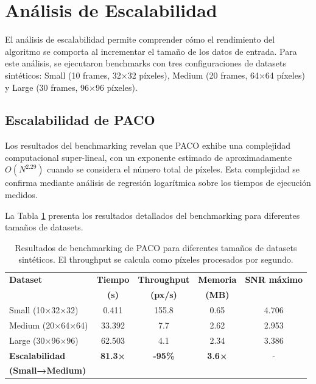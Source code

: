 \section{Análisis de Escalabilidad}

El análisis de escalabilidad permite comprender cómo el rendimiento del algoritmo se comporta al incrementar el tamaño de los datos de entrada. Para este análisis, se ejecutaron benchmarks con tres configuraciones de datasets sintéticos: Small (10 frames, 32×32 píxeles), Medium (20 frames, 64×64 píxeles) y Large (30 frames, 96×96 píxeles).

\subsection{Escalabilidad de PACO}

Los resultados del benchmarking revelan que PACO exhibe una complejidad computacional super-lineal, con un exponente estimado de aproximadamente $O(N^{2.29})$ cuando se considera el número total de píxeles. Esta complejidad se confirma mediante análisis de regresión logarítmica sobre los tiempos de ejecución medidos.

La Tabla \ref{tab:escalabilidad_paco} presenta los resultados detallados del benchmarking para diferentes tamaños de datasets.

\begin{table}[H]
    \centering
    \small
    \begin{tabular}{lcccc}
        \toprule
        \textbf{Dataset} & \textbf{Tiempo} & \textbf{Throughput} & \textbf{Memoria} & \textbf{SNR máximo} \\
        & \textbf{(s)} & \textbf{(px/s)} & \textbf{(MB)} & \\
        \midrule
        Small (10×32×32) & 0.411 & 155.8 & 0.65 & 4.706 \\
        Medium (20×64×64) & 33.392 & 7.7 & 2.62 & 2.953 \\
        Large (30×96×96) & 62.503 & 4.1 & 2.34 & 3.386 \\
        \midrule
        \textbf{Escalabilidad} & \textbf{81.3×} & \textbf{-95\%} & \textbf{3.6×} & - \\
        \textbf{(Small→Medium)} & & & & \\
        \bottomrule
    \end{tabular}
    \caption{Resultados de benchmarking de PACO para diferentes tamaños de datasets sintéticos. El throughput se calcula como píxeles procesados por segundo.}
    \label{tab:escalabilidad_paco}
\end{table}


